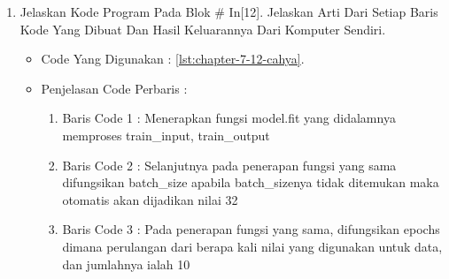 \begin{enumerate}
\begin{itemize}
\par
\par
\item Penjelasan Code Perbaris : 
\begin{enumerate}
\item Baris Code 1 : Memasukkan / Mengimport library keras.callbacks dimana digunakan dalam penulisan log untuk TensorBoard
\item Baris Code 2 : Membuat variabel tenserboard yang mendefinisikan fungsi TensorBoard pada keras.callbacks yang digunakan sebagai alat visualisasi yang disediakan dengan TensorFlow. Kemudian untuk fungsi log\_dir memanggil data yaitu './logs/mnist-style'
\end{enumerate}
\par
\item Hasil : \ref{chapter-7-in-11-cahya}
\par
\par
\begin{figure}[!hbtp]
\centering
\texttt{[image: figures/chapter-7-in-11-cahya.jpg]}
\caption{Code Program Pada In [11] - cahya}
\label{chapter-7-in-11-cahya}
\end{figure}
\par
\par
\end{itemize}
\par
\par
\par
\item Jelaskan Kode Program Pada Blok \# In[12]. Jelaskan Arti Dari Setiap Baris Kode Yang Dibuat Dan Hasil Keluarannya Dari Komputer Sendiri.
\begin{itemize}
\item Code Yang Digunakan : \ref{lst:chapter-7-12-cahya}.

\par
\par
\item Penjelasan Code Perbaris : 
\begin{enumerate}
\item Baris Code 1 : Menerapkan fungsi model.fit yang didalamnya memproses train\_input, train\_output
\item Baris Code 2 : Selanjutnya pada penerapan fungsi yang sama difungsikan batch\_size apabila batch\_sizenya tidak ditemukan maka otomatis akan dijadikan nilai 32
\item Baris Code 3 : Pada penerapan fungsi yang sama, difungsikan epochs dimana perulangan dari berapa kali nilai yang digunakan untuk data, dan jumlahnya ialah 10

\end{enumerate}
\end{itemize}
\end{enumerate}
